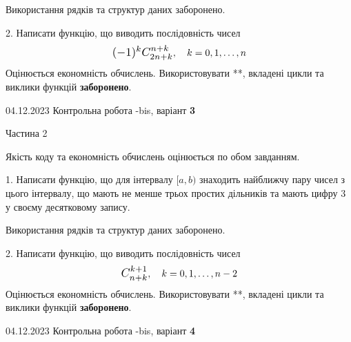 \documentclass[12pt, ukrainian]{article}
\begin{document}
{{\begin {Large}
 Використання рядків та структур даних заборонено. 



\vspace{10mm}



2. 
Написати функцію, що виводить послідовність чисел
$$\scalebox{1.2}{$(-1)^{k}C_{2n+k}^{n+k}$}, \quad k=0,1,\ldots,n$$
Оцінюється економність обчислень. Використовувати **, вкладені цикли та виклики функцій \textbf{заборонено}.

\end{Large}\newpage




\begin {Huge}
{{04.12.2023 Контрольна робота -bis, варіант  \No \textbf { 3 }\par}}

\begin{center}Частина 2
\end{center}
\vspace{10mm}
\end {Huge}

{
\begin {Large}
Якість коду та економність обчислень оцінюється по обом завданням. 

\vspace{5mm}

1. Написати функцію, що для інтервалу $[a, b)$ знаходить найближчу пару чисел з цього інтервалу, що мають не менше трьох простих дільників та мають цифру 3 у своєму десятковому запису.

 Використання рядків та структур даних заборонено. 



\vspace{10mm}



2. 
Написати функцію, що виводить послідовність чисел
$$\scalebox{1.2}{$C_{n+k}^{k+1}$}, \quad k=0,1,\ldots,n-2$$
Оцінюється економність обчислень. Використовувати **, вкладені цикли та виклики функцій \textbf{заборонено}.

\end{Large}\newpage




\begin {Huge}
{{04.12.2023 Контрольна робота -bis, варіант  \No \textbf { 4 }\par}}


\end{Huge}}}}
\end{document}
